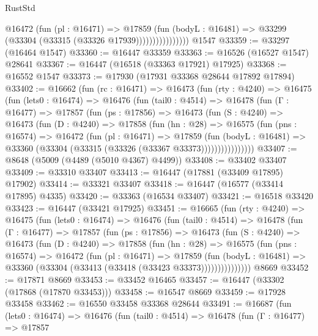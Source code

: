 \begin{lexlean}{RustStd}
\begin{coremodule}
{\begin{coremodule}
{{{{{{{{{{{{{{{{{{{{{{{{{{{{{{{{{{{{{{{{{{{{{{{{{{{{{{{                        @16472
                          (fun (pl : @16471) =>
                          @17859
                            (fun (bodyL : @16481) =>
                            @33299 (@33304 (@33315 (@33326 @17939))))))))))))))))
    @1547
@33359 := @33297 (@16464 @1547)
@33360 := @16447 @33359
@33363 := @16526 (@16527 @1547) @28641
@33367 := @16447 (@16518 (@33363 @17921) @17925)
@33368 := @16552 @1547
@33373 := @17930 (@17931 @33368 @28644 @17892 @17894)
@33402 := @16662
    (fun (rc : @16471) =>
    @16473
      (fun (rty : @4240) =>
      @16475
        (fun (lets0 : @16474) =>
        @16476
          (fun (tail0 : @4514) =>
          @16478
            (fun (Γ : @16477) =>
            @17857
              (fun (ps : @17856) =>
              @16473
                (fun (S : @4240) =>
                @16473
                  (fun (D : @4240) =>
                  @17858
                    (fun (hn : @28) =>
                    @16575
                      (fun (pns : @16574) =>
                      @16472
                        (fun (pl : @16471) =>
                        @17859
                          (fun (bodyL : @16481) =>
                          @33360 (@33304 (@33315 (@33326 (@33367 @33373))))))))))))))))
@33407 := @8648 (@5009 (@4489 (@5010 @4367) @4499))
@33408 := @33402 @33407
@33409 := @33310 @33407
@33413 := @16447 (@17881 (@33409 @17895) @17902)
@33414 := @33321 @33407
@33418 := @16447 (@16577 (@33414 @17895) @4335)
@33420 := @33363 (@16534 @33407)
@33421 := @16518 @33420
@33423 := @16447 (@33421 @17925)
@33451 := @16665
    (fun (rty : @4240) =>
    @16475
      (fun (lets0 : @16474) =>
      @16476
        (fun (tail0 : @4514) =>
        @16478
          (fun (Γ : @16477) =>
          @17857
            (fun (ps : @17856) =>
            @16473
              (fun (S : @4240) =>
              @16473
                (fun (D : @4240) =>
                @17858
                  (fun (hn : @28) =>
                  @16575
                    (fun (pns : @16574) =>
                    @16472
                      (fun (pl : @16471) =>
                      @17859
                        (fun (bodyL : @16481) =>
                        @33360 (@33304 (@33413 (@33418 (@33423 @33373)))))))))))))))
    @8669
@33452 := @17871 @8669
@33453 := @33452 @16465
@33457 := @16447 (@33302 (@17868 (@17870 @33453)))
@33458 := @16547 @8669
@33459 := @17928 @33458
@33462 := @16550 @33458 @33368 @28644
@33491 := @16687
    (fun (lets0 : @16474) =>
    @16476
      (fun (tail0 : @4514) =>
      @16478
        (fun (Γ : @16477) =>
        @17857
}}}}}}}}}}}}}}}}}}}}}}}}}}}}}}}}}}}}}}}}}}}}}}}}}}}}}}}
\end{coremodule}}
\end{coremodule}
\end{lexlean}
